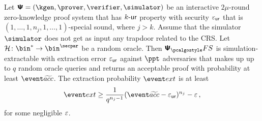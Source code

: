 \let\accentvec\vec \documentclass[runningheads,10pt]{llncs}
\begin{document}
\begin{theorem}
	\label{thm:se}
	Let $\ps = (\kgen, \prover, \verifier, \simulator)$ be an interactive $2 \mu$-round zero-knowledge proof system that has ${k\text{-}\mathsf{ur}}$ property with security $\varepsilon_{\mathsf{ur}}$ that is $(1, \ldots, 1, n_j, 1, \ldots, 1)$-special sound, where $j > k$.
	Assume that the simulator $\simulator$ does not get as input any trapdoor related to the CRS.
	Let $\ro\colon \bin^{*} \to \bin^{\secpar}$ be a random oracle. 
	Then $\psfs$ is simulation-extractable with extraction error $\varepsilon_{\mathsf{ur}}$ against $\ppt$ adversaries that makes up up to $q$ random oracle queries and returns an acceptable proof with probability at least $\waccProb$. 
	The extraction probability $\extProb$ is at least
	\[
		\extProb \geq \frac{1}{q^{n_j - 1}} (\waccProb - \epsur)^{n_j} -\eps\,,
	\]
	for some negligible $\varepsilon$.	
\end{theorem}
\end{document}
